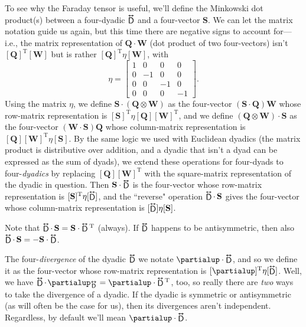 \documentclass[12pt]{article}
\renewcommand{\vv}[1]{\mathbf{#1}}
\newcommand{\tightoverset}[2]{%
  \mathop{#2}\limits^{\vbox to -.5ex{\kern-0.75ex\hbox{$#1$}\vss}}}
\newcommand{\inlinedy}[1]{\tightoverset{\text{\tiny$\bm\leftrightarrow$}}{#1}}
\begin{document}
To see why the Faraday tensor is useful, we'll define the Minkowski dot product(s) between a four-dyadic $\inlinedy{\mathsf{D}}$ and a four-vector $\vv S$. We can let the matrix notation guide us again, but this time there are negative signs to account for---i.e., the matrix representation of $\vv Q \cdot \vv W$ (dot product of two four-vectors) isn't $[\vv Q]^{\textrm{T}} [\vv W]$ but is rather $[\vv Q]^{\textrm{T}} \eta [\vv W]$, with
\begin{equation}\label{eq:mmt}
\eta
=
\begin{bmatrix}
1 & 0 & 0 & 0 \\
0 & -1 & 0 & 0 \\
0 & 0 & -1 & 0 \\
0 & 0 & 0 & -1
\end{bmatrix} .
\end{equation}
Using the matrix $\eta$, we define $\vv S \cdot (\vv Q \otimes \vv W)$ as the four-vector $(\vv S \cdot \vv Q) \vv W$ whose row-matrix representation is $[\vv S]^\mathrm{T} \eta [\vv Q] [\vv W]^\mathrm{T}$, and we define $(\vv Q \otimes \vv W) \cdot \vv S$ as the four-vector $(\vv W \cdot \vv S) \vv Q$ whose column-matrix representation is $[\vv Q] [\vv W]^\mathrm{T} \eta [\vv S]$. By the same logic we used with Euclidean dyadics (the matrix product is distributive over addition, and a dyadic that isn't a dyad can be expressed as the sum of dyads), we extend these operations for four-dyads to four-\emph{dyadics} by replacing $[\vv Q][\vv W]^{\textrm{T}}$ with the square-matrix representation of the dyadic in question. Then $\vv S \cdot \inlinedy{\mathsf{D}}$ is the four-vector whose row-matrix representation is $[\vv S]^{\mathrm{T}} \eta [\inlinedy{\mathsf{D}}]$, and the ``reverse" operation $\inlinedy{\mathsf{D}} \cdot \, \vv S$ gives the four-vector whose column-matrix representation is $[\inlinedy{\mathsf{D}}] \eta [\vv S]$.

Note that $\inlinedy{\mathsf{D}} \cdot \, \vv S = \vv S \cdot \inlinedy{\mathsf{D}} {}^\mathrm{T}$ (always). If $\inlinedy{\mathsf{D}}$ happens to be antisymmetric, then also $\inlinedy{\mathsf{D}} \cdot \, \vv S = - \vv S \cdot \inlinedy{\mathsf{D}}$.

The four-\emph{divergence} of the dyadic $\inlinedy{\mathsf{D}}$ we notate $\partialup \cdot \inlinedy{\mathsf{D}}$, and so we define it as the four-vector whose row-matrix representation is $[\partialup]^{\mathrm{T}} \eta [\inlinedy{\mathsf{D}}]$. Well, we have $\inlinedy{\mathsf{D}} \cdot \mkern2mu \partialup_{\inlinedy{\mathsf{D}}} = \partialup \cdot \inlinedy{\mathsf{D}} {}^\mathrm{T}$, too, so really there are \emph{two} ways to take the divergence of a dyadic. If the dyadic is symmetric or antisymmetric (as will often be the case for us), then its divergences aren't independent. Regardless, by default we'll mean $\partialup \cdot \inlinedy{\mathsf{D}}$.
\end{document}
